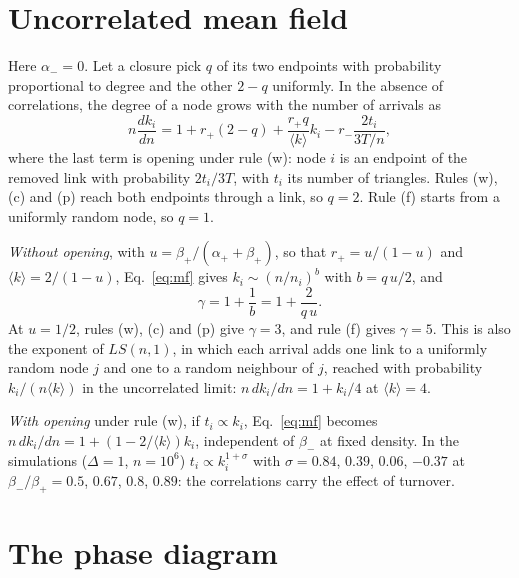 \documentclass[aps,pre,twocolumn,superscriptaddress,floatfix,nofootinbib]{revtex4-2}
\begin{document}
\section{Uncorrelated mean field}
\label{sec:meanfield}

Here $\alpha_-=0$. Let a closure pick $q$ of its two endpoints with
probability proportional to degree and the other $2-q$ uniformly. In the
absence of correlations, the degree of a node grows with the number of
arrivals as
\begin{equation}
  n\frac{dk_i}{dn}=1+r_+(2-q)+\frac{r_+q}{\langle k\rangle}k_i
  -r_-\frac{2t_i}{3T/n},
  \label{eq:mf}
\end{equation}
where the last term is opening under rule (w): node $i$ is an endpoint of the
removed link with probability $2t_i/3T$, with $t_i$ its number of triangles.
Rules (w), (c) and (p) reach both endpoints through a link, so $q=2$. Rule (f)
starts from a uniformly random node, so $q=1$.

\emph{Without opening}, with $u=\beta_+/(\alpha_++\beta_+)$, so that
$r_+=u/(1-u)$ and $\langle k\rangle=2/(1-u)$, Eq.~\eqref{eq:mf} gives
$k_i\sim(n/n_i)^b$ with $b=q\,u/2$, and
\begin{equation}
  \gamma=1+\frac{1}{b}=1+\frac{2}{q\,u}.
  \label{eq:gamma}
\end{equation}
At $u=1/2$, rules (w), (c) and (p) give $\gamma=3$, and rule (f) gives
$\gamma=5$. This is also the exponent of $LS(n,1)$, in which each arrival adds
one link to a uniformly random node $j$ and one to a random neighbour of $j$,
reached with probability $k_i/(n\langle k\rangle)$ in the uncorrelated limit:
$n\,dk_i/dn=1+k_i/4$ at $\langle k\rangle=4$.

\emph{With opening} under rule (w), if $t_i\propto k_i$, Eq.~\eqref{eq:mf}
becomes $n\,dk_i/dn=1+(1-2/\langle k\rangle)k_i$, independent of $\beta_-$ at
fixed density. In the simulations ($\Delta=1$, $n=10^6$) $t_i\propto
k_i^{1+\sigma}$ with $\sigma=0.84$, $0.39$, $0.06$, $-0.37$ at
$\beta_-/\beta_+=0.5$, $0.67$, $0.8$, $0.89$: the correlations carry the effect
of turnover.

\section{The phase diagram}
\label{sec:phase}
\end{document}
